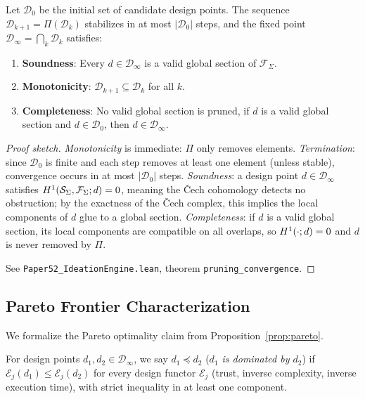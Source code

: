 \documentclass[11pt]{article}
\begin{document}
\begin{theorem}\label{thm:pruning-convergence}
Let $\mathcal{D}_0$ be the initial set of candidate design points.
The sequence $\mathcal{D}_{k+1} = \Pi(\mathcal{D}_k)$ stabilizes in
at most $|\mathcal{D}_0|$ steps, and the fixed point
$\mathcal{D}_\infty = \bigcap_k \mathcal{D}_k$ satisfies:
\begin{enumerate}[noitemsep]
  \item \textbf{Soundness}: Every $d \in \mathcal{D}_\infty$ is a
        valid global section of $\mathcal{F}_\Sigma$.
  \item \textbf{Monotonicity}: $\mathcal{D}_{k+1} \subseteq
        \mathcal{D}_k$ for all $k$.
  \item \textbf{Completeness}: No valid global section is pruned, \ie
        if $d$ is a valid global section and $d \in \mathcal{D}_0$,
        then $d \in \mathcal{D}_\infty$.
\end{enumerate}
\end{theorem}

\begin{proof}[Proof sketch]
\emph{Monotonicity} is immediate: $\Pi$ only removes elements.
\emph{Termination}: since $\mathcal{D}_0$ is finite and each step
removes at least one element (unless stable), convergence occurs in
at most $|\mathcal{D}_0|$ steps.  \emph{Soundness}: a design point
$d \in \mathcal{D}_\infty$ satisfies $H^{1}(\mathcal{S}_\Sigma,
\mathcal{F}_\Sigma; d) = 0$, meaning the \v{C}ech cohomology detects
no obstruction; by the exactness of the \v{C}ech complex, this implies
the local components of $d$ glue to a global section.
\emph{Completeness}: if $d$ is a valid global section, its local
components are compatible on all overlaps, so
$H^{1}(\cdot; d) = 0$ and $d$ is never removed by $\Pi$.

See \texttt{Paper52\_IdeationEngine.lean}, theorem
\texttt{pruning\_convergence}.
\end{proof}

\subsection{Pareto Frontier Characterization}

We formalize the Pareto optimality claim from
Proposition~\ref{prop:pareto}.

\begin{definition}\label{def:dominance}
For design points $d_1, d_2 \in \mathcal{D}_\infty$, we say $d_1
\preceq d_2$ (\emph{$d_1$ is dominated by $d_2$}) if
$\mathcal{E}_j(d_1) \leq \mathcal{E}_j(d_2)$ for every design
functor $\mathcal{E}_j$ (trust, inverse complexity, inverse
execution time), with strict inequality in at least one component.
\end{definition}
\end{document}
